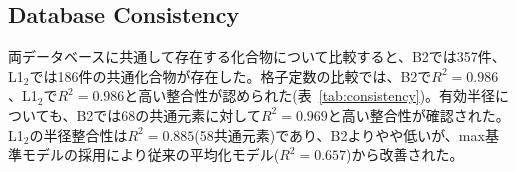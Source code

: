 \documentclass[a4paper,10pt,5p]{elsarticle}
\begin{document}
\begin{table}[htbp]      \small
    \centering
    \caption{B2-L1$_2$ radius contraction statistics by element group (MP data). The ``Avg.'' column shows the mean contraction rate, and ``Range'' shows the minimum to maximum values within each group. Negative values indicate B2 radius smaller than L1$_2$ radius.}
    \label{tab:element_groups}
\end{table}

\subsection{Database Consistency}
両データベースに共通して存在する化合物について比較すると、B2では357件、L1$_2$では186件の共通化合物が存在した。格子定数の比較では、B2で$R^2 = 0.986$、L1$_2$で$R^2 = 0.986$と高い整合性が認められた(表~\ref{tab:consistency})。有効半径についても、B2では68の共通元素に対して$R^2 = 0.969$と高い整合性が確認された。L1$_2$の半径整合性は$R^2 = 0.885$(58共通元素)であり、B2よりやや低いが、max基準モデルの採用により従来の平均化モデル($R^2 = 0.657$)から改善された。

\end{document}
